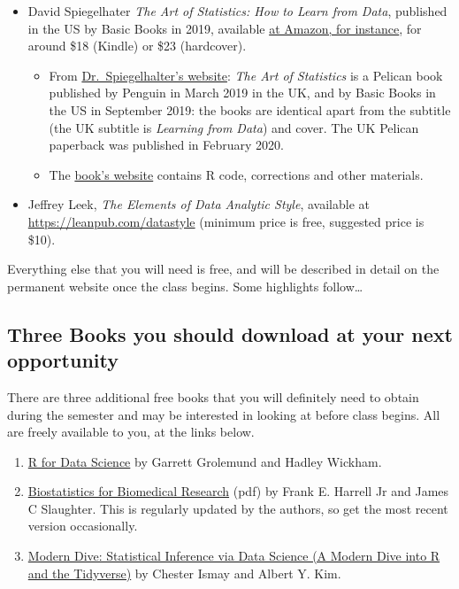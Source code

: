 \documentclass[
]{book}
\providecommand{\tightlist}{%
  \setlength{\itemsep}{0pt}\setlength{\parskip}{0pt}}
\begin{document}
\begin{itemize}
\tightlist
\item
  David Spiegelhater \emph{The Art of Statistics: How to Learn from Data}, published in the US by Basic Books in 2019, available \href{https://www.amazon.com/Art-Statistics-How-Learn-Data/dp/1541618513}{at Amazon, for instance}, for around \$18 (Kindle) or \$23 (hardcover).

  \begin{itemize}
  \tightlist
  \item
    From \href{http://www.statslab.cam.ac.uk/~david/}{Dr.~Spiegelhalter's website}: \emph{The Art of Statistics} is a Pelican book published by Penguin in March 2019 in the UK, and by Basic Books in the US in September 2019: the books are identical apart from the subtitle (the UK subtitle is \emph{Learning from Data}) and cover. The UK Pelican paperback was published in February 2020.
  \item
    The \href{https://dspiegel29.github.io/ArtofStatistics/}{book's website} contains R code, corrections and other materials.
  \end{itemize}
\item
  Jeffrey Leek, \emph{The Elements of Data Analytic Style}, available at \url{https://leanpub.com/datastyle} (minimum price is free, suggested price is \$10).
\end{itemize}

Everything else that you will need is free, and will be described in detail on the permanent website once the class begins. Some highlights follow\ldots{}

\hypertarget{three-books-you-should-download-at-your-next-opportunity}{%
\subsection{Three Books you should download at your next opportunity}\label{three-books-you-should-download-at-your-next-opportunity}}

There are three additional free books that you will definitely need to obtain during the semester and may be interested in looking at before class begins. All are freely available to you, at the links below.

\begin{enumerate}
\def\labelenumi{\arabic{enumi}.}
\tightlist
\item
  \href{https://r4ds.had.co.nz/}{R for Data Science} by Garrett Grolemund and Hadley Wickham.
\item
  \href{http://hbiostat.org/doc/bbr.pdf}{Biostatistics for Biomedical Research} (pdf) by Frank E. Harrell Jr and James C Slaughter. This is regularly updated by the authors, so get the most recent version occasionally.
\item
  \href{https://moderndive.com}{Modern Dive: Statistical Inference via Data Science (A Modern Dive into R and the Tidyverse)} by Chester Ismay and Albert Y. Kim.
\end{enumerate}
\end{document}

